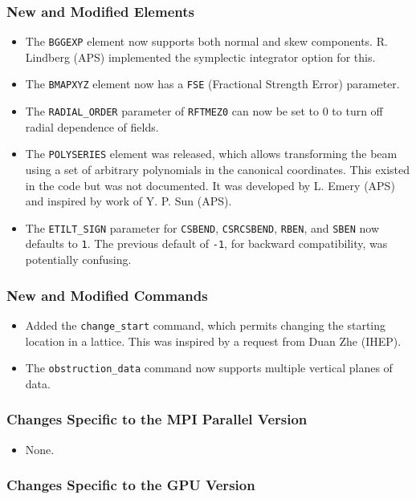 \documentclass[11pt]{article}
\begin{document}
\subsubsection{New and Modified Elements}
\begin{itemize}
\item The \verb|BGGEXP| element now supports both normal and skew components. R. Lindberg (APS) implemented the
  symplectic integrator option for this.
\item The \verb|BMAPXYZ| element now has a \verb|FSE| (Fractional Strength Error) parameter.
\item The \verb|RADIAL_ORDER| parameter of \verb|RFTMEZ0| can now be set to 0 to turn off radial dependence of
  fields.
\item The \verb|POLYSERIES| element was released, which allows transforming the beam using a set of arbitrary polynomials
  in the canonical coordinates.  This existed in the code but was not documented.
  It was developed by L. Emery (APS) and inspired by work of Y. P. Sun (APS).
\item The \verb|ETILT_SIGN| parameter for \verb|CSBEND|, \verb|CSRCSBEND|, \verb|RBEN|, and \verb|SBEN| now defaults
  to \verb|1|. The previous default of \verb|-1|, for backward compatibility, was potentially confusing.
\end{itemize}

\subsubsection{New and Modified Commands}
\begin{itemize}
\item Added the \verb|change_start| command, which permits changing the starting location in a lattice.
  This was inspired by a request from Duan Zhe (IHEP).
\item The \verb|obstruction_data| command now supports multiple vertical planes of data.
\end{itemize}

\subsubsection{Changes Specific to the MPI Parallel Version}

\begin{itemize}
\item None.
\end{itemize}

\subsubsection{Changes Specific to the GPU Version}
\end{document}
